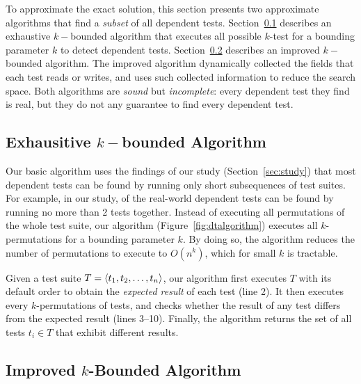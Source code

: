 To approximate the exact solution, this section
presents two approximate algorithms that find a \textit{subset} of
all dependent tests.
Section~\ref{sec:basic} describes an exhaustive $k-$bounded algorithm that
executes all possible $k$-test for a bounding parameter $k$
to detect dependent tests.
Section~\ref{sec:advalgorithm} describes an improved $k-$bounded algorithm.
The improved algorithm dynamically collected the fields that each test
reads or writes, and uses such collected information to reduce the search space.
Both algorithms are \textit{sound} but \textit{incomplete}:
every dependent test they find is real, but they do not
any guarantee to find every dependent test.


\subsection{Exhausitive $k-$bounded Algorithm}
\label{sec:basic}


Our basic algorithm uses the findings of our study
(Section~\ref{sec:study})
that most dependent tests can be found by running only short
subsequences of test suites. For example,
in our study, \pertange of the real-world dependent tests
can be found by running no more than 2 tests together.
Instead of executing all permutations of the
whole test suite, our algorithm (Figure~\ref{fig:dtalgorithm})
executes all $k$-permutations for a bounding
parameter $k$.
By doing so, the algorithm reduces
the number of permutations to execute
to $O(n^k)$, which for small $k$ is tractable. 


Given a test suite $T =  \langle t_1, t_2, \ldots, t_n \rangle $, our algorithm
first executes $T$ with its default order
to obtain the \emph{expected result} of each test (line 2). 
It then executes every $k$-permutations of tests,
and checks whether the result of any test differs
from the expected result (lines 3--10). Finally, the algorithm returns the set
of all tests $t_i \in T$
that exhibit different results.





\subsection{Improved $k$-Bounded Algorithm}
\label{sec:advalgorithm}

